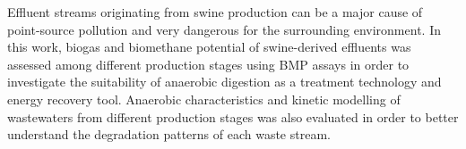 Effluent streams originating from swine production can be a major cause of point-source pollution and very dangerous for the surrounding environment. In this work, biogas and biomethane potential of swine-derived effluents was assessed among different production stages using BMP assays in order to investigate the suitability of anaerobic digestion as a treatment technology and energy recovery tool. Anaerobic characteristics and kinetic modelling of wastewaters from different production stages was also evaluated in order to better understand the degradation patterns of each waste stream.